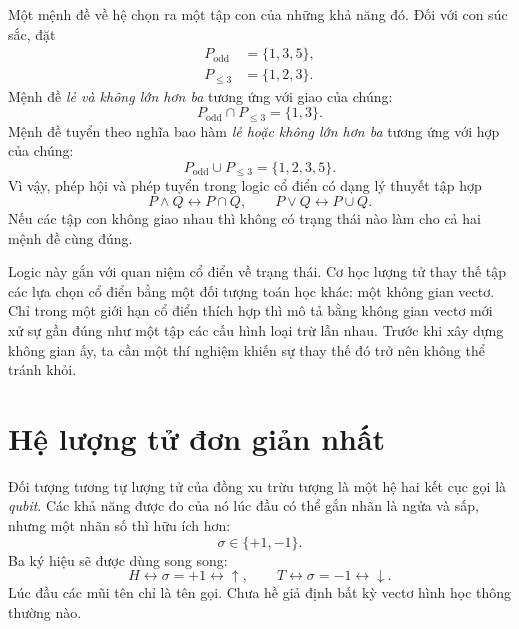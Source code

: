 Một mệnh đề về hệ chọn ra một tập con của những khả năng đó. Đối với con súc sắc, đặt
\begin{align}
  P_{\mathrm{odd}}&=\{1,3,5\},\\
  P_{\leq 3}&=\{1,2,3\}.
\end{align}
Mệnh đề \emph{lẻ và không lớn hơn ba} tương ứng với giao của chúng:
\begin{equation}
  P_{\mathrm{odd}}\cap P_{\leq 3}=\{1,3\}.
\end{equation}
Mệnh đề tuyển theo nghĩa bao hàm \emph{lẻ hoặc không lớn hơn ba} tương ứng với hợp của chúng:
\begin{equation}
  P_{\mathrm{odd}}\cup P_{\leq 3}
  =
  \{1,2,3,5\}.
\end{equation}
Vì vậy, phép hội và phép tuyển trong logic cổ điển có dạng lý thuyết tập hợp
\begin{equation}
  P\wedge Q\longleftrightarrow P\cap Q,
  \qquad
  P\vee Q\longleftrightarrow P\cup Q.
\end{equation}
Nếu các tập con không giao nhau thì không có trạng thái nào làm cho cả hai mệnh đề cùng đúng.

Logic này gắn với quan niệm cổ điển về trạng thái. Cơ học lượng tử thay thế tập các lựa chọn cổ điển bằng một đối tượng toán học khác: một không gian vectơ. Chỉ trong một giới hạn cổ điển thích hợp thì mô tả bằng không gian vectơ mới xử sự gần đúng như một tập các cấu hình loại trừ lẫn nhau. Trước khi xây dựng không gian ấy, ta cần một thí nghiệm khiến sự thay thế đó trở nên không thể tránh khỏi.

\section{Hệ lượng tử đơn giản nhất}

Đối tượng tương tự lượng tử của đồng xu trừu tượng là một hệ hai kết cục gọi là \emph{qubit}. Các khả năng được đo của nó lúc đầu có thể gắn nhãn là ngửa và sấp, nhưng một nhãn số thì hữu ích hơn:
\begin{equation}
  \sigma\in\{+1,-1\}.
\end{equation}
Ba ký hiệu sẽ được dùng song song:
\begin{equation}
  H\longleftrightarrow \sigma=+1\longleftrightarrow\uparrow,
  \qquad
  T\longleftrightarrow \sigma=-1\longleftrightarrow\downarrow.
\end{equation}
Lúc đầu các mũi tên chỉ là tên gọi. Chưa hề giả định bất kỳ vectơ hình học thông thường nào.

